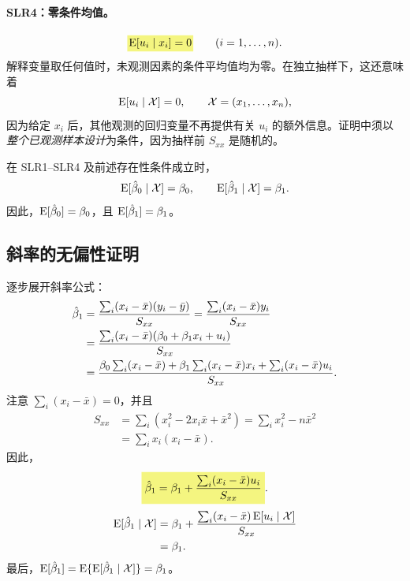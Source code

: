 \paragraph{SLR4：零条件均值。}
\[\hy{$\E[u_i\mid x_i]=0$}\qquad(i=1,\ldots,n).\]
解释变量取任何值时，未观测因素的条件平均值均为零。在独立抽样下，这还意味着
\[\operatorname{E}[u_i\mid\mathcal X]=0,\qquad\mathcal X=(x_1,\ldots,x_n),\]
因为给定 $x_i$ 后，其他观测的回归变量不再提供有关 $u_i$ 的额外信息。证明中须以\emph{整个已观测样本设计}为条件，因为抽样前 $S_{xx}$ 是随机的。

\begin{theorem}\label{thm:simple-unbiased}
在 SLR1--SLR4 及前述存在性条件成立时，
\[\operatorname{E}[\hat\beta_0\mid\mathcal X]=\beta_0,\qquad
\operatorname{E}[\hat\beta_1\mid\mathcal X]=\beta_1.\]
因此，$\operatorname{E}[\hat\beta_0]=\beta_0$，且 $\operatorname{E}[\hat\beta_1]=\beta_1$。
\end{theorem}

\subsection{斜率的无偏性证明}
逐步展开斜率公式：
\begin{align}
\hat\beta_1
&=\frac{\sum_i(x_i-\bar x)(y_i-\bar y)}{S_{xx}}
=\frac{\sum_i(x_i-\bar x)y_i}{S_{xx}}\notag\\
&=\frac{\sum_i(x_i-\bar x)(\beta_0+\beta_1x_i+u_i)}{S_{xx}}\notag\\
&=\frac{\beta_0\sum_i(x_i-\bar x)
+\beta_1\sum_i(x_i-\bar x)x_i+\sum_i(x_i-\bar x)u_i}{S_{xx}}.\label{eq:slope-expansion}
\end{align}
注意 $\sum_i(x_i-\bar x)=0$，并且
\begin{align*}
S_{xx}&=\sum_i(x_i^2-2x_i\bar x+\bar x^2)
=\sum_i x_i^2-n\bar x^2\\
&=\sum_i x_i(x_i-\bar x).
\end{align*}
因此，
\begin{equation}\label{eq:slope-error}
\hm{\hat\beta_1=\beta_1+\frac{\sum_i(x_i-\bar x)u_i}{S_{xx}}}.
\end{equation}
\begin{align*}
\operatorname{E}[\hat\beta_1\mid\mathcal X]
&=\beta_1+\frac{\sum_i(x_i-\bar x)\operatorname{E}[u_i\mid\mathcal X]}{S_{xx}}\\
&=\beta_1.
\end{align*}
最后，$\operatorname{E}[\hat\beta_1]=\operatorname{E}\{\operatorname{E}[\hat\beta_1\mid\mathcal X]\}=\beta_1$。

